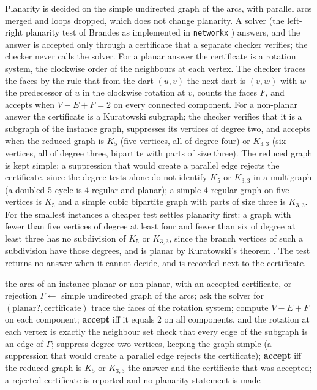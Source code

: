 \documentclass[11pt]{article}
\theoremstyle{remark}
\begin{document}
Planarity is decided on the simple undirected graph of the arcs, with parallel arcs merged and loops dropped, which does not change planarity.
A solver (the left-right planarity test of Brandes \cite{Bra09} as implemented in \texttt{networkx} \nnetworkx) answers, and the answer is accepted only through a certificate that a separate checker verifies; the checker never
calls the solver. For a planar answer the certificate is a rotation system, the clockwise order of the neighbours at each vertex. The checker traces the faces by the rule that
from the dart $(u,v)$ the next dart is $(v,w)$ with $w$ the predecessor of $u$ in the clockwise rotation at $v$, counts the faces $F$, and accepts when $V-E+F=2$ on every connected component. For a
non-planar answer the certificate is a Kuratowski subgraph; the checker verifies that it is a subgraph of the instance graph, suppresses its vertices of degree two, and accepts when the reduced graph
is $K_5$ (five vertices, all of degree four) or $K_{3,3}$ (six vertices, all of degree three, bipartite with parts of size three). The reduced graph is kept simple: a suppression that would create a parallel edge
rejects the certificate, since the degree tests alone do not identify $K_5$ or $K_{3,3}$ in a multigraph (a doubled 5-cycle is 4-regular and planar); a simple 4-regular graph on five vertices is $K_5$ and a simple cubic bipartite graph with parts of
size three is $K_{3,3}$. For the smallest instances a cheaper test settles planarity first: a graph with fewer than
five vertices of degree at least four and fewer than six of degree at least three has no subdivision of $K_5$ or $K_{3,3}$, since the branch vertices of such a subdivision have those degrees, and is
planar by Kuratowski's theorem \cite{Kur30}. The test returns no answer when it cannot decide, and is recorded next to the certificate.

\begin{algorithm}[t]
\caption{Certified planarity: a solver proposes a rotation system or a Kuratowski subgraph, and an independent checker accepts only a valid certificate.}
\label{alg:planar}
\begin{algorithmic}[1]
\Require the arcs of an instance
\Ensure planar or non-planar, with an accepted certificate, or rejection
\State $\Gamma\gets$ simple undirected graph of the arcs; ask the solver for $(\text{planar?},\text{certificate})$
 \State trace the faces of the rotation system; compute $V-E+F$ on each component; \textbf{accept} iff it equals $2$ on all components, and the rotation at each vertex is exactly the neighbour set
\Else \State check that every edge of the subgraph is an edge of $\Gamma$; suppress degree-two vertices, keeping the graph simple (a suppression that would create a parallel edge rejects the certificate); \textbf{accept} iff the reduced graph is $K_5$ or $K_{3,3}$
\EndIf
\State \Return the answer and the certificate that was accepted; a rejected certificate is reported and no planarity statement is made
\end{algorithmic}
\end{algorithm}
\end{document}
